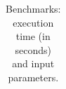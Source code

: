 \begin{table}[!t]
\begin{tabular}{l|rrr|rr|l}
\hline
\end{tabular}
\caption{Benchmarks: execution time (in seconds) and input parameters.\label{tbl:benchmarks}}
\end{table}


